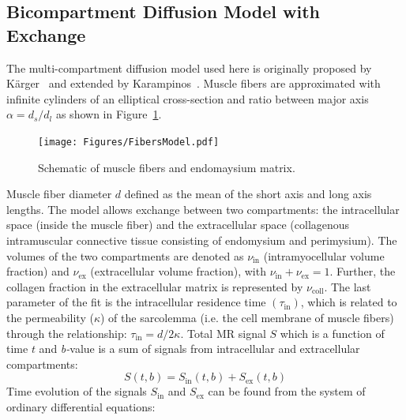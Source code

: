 \subsection{Bicompartment Diffusion Model with Exchange}
\label{subsec: bicompart}
The multi-compartment diffusion model used here is originally proposed by K\"arger~\cite{KARGER19881} and extended by Karampinos~\cite{RND12}. 
Muscle fibers are approximated with infinite cylinders of an elliptical cross-section and ratio between major axis $\alpha = d_s/d_l$ as shown in Figure~\ref{fig: KargerModel}. 
\begin{figure}[!htb]
\vspace{+0.2cm}
\centering
\texttt{[image: Figures/FibersModel.pdf]}
\caption[Schematic of muscle fibers and endomaysium matrix]{Schematic of muscle fibers and endomaysium matrix.}
\label{fig: KargerModel}
\end{figure}
Muscle fiber diameter $d$ defined as the mean of the short axis and long axis lengths.
The model allows exchange between two compartments: the intracellular space (inside the muscle fiber) and the extracellular space (collagenous intramuscular connective tissue consisting of endomysium and perimysium).
The volumes of the two compartments are denoted as $\nu_{\mathrm{in}}$ (intramyocellular volume fraction) and $\nu_{\mathrm{ex}}$ (extracellular volume fraction), with $\nu_{\mathrm{in}} + \nu_{\mathrm{ex}} = 1$. 
Further, the collagen fraction in the extracellular matrix is represented by $\nu_{\mathrm{coll}}$. 
The last parameter of the fit is the intracellular residence time $(\tau_{\mathrm{in}})$, which is related to the permeability ($\kappa$) of the sarcolemma (i.e. the cell membrane of muscle fibers) through the relationship: $\tau_{\mathrm{in}} = d/2\kappa$. 
Total MR signal $S$ which is a function of time $t$ and \mbox{\textit{b-}value} is a sum of signals from intracellular and extracellular compartments:
\begin{equation}\label{eq: Karger Signal}
S(t,b) = S_{\mathrm{in}}(t,b)+S_{\mathrm{ex}}(t,b)
\end{equation}
Time evolution of the signals $S_\mathrm{in}$ and $S_\mathrm{ex}$ can be found from the system of ordinary differential equations:
